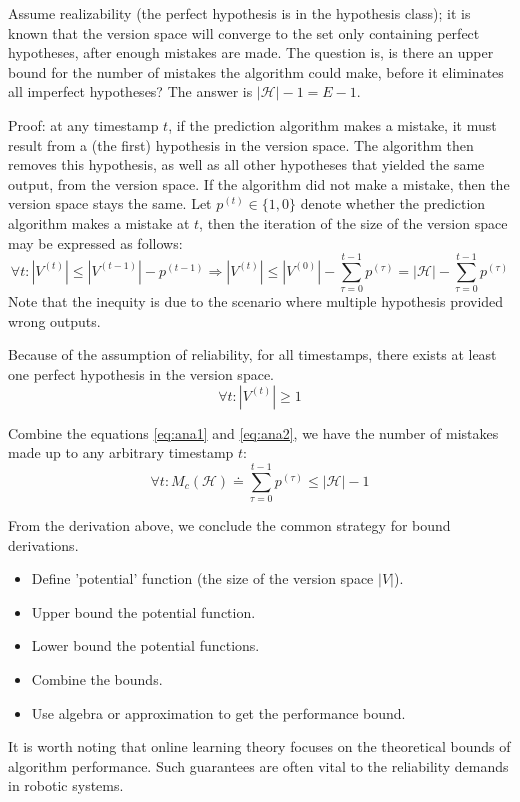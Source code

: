 \documentclass[11pt]{article}
\begin{document}
Assume realizability (the perfect hypothesis is in the hypothesis class); it is known that the version space will converge to the set only containing perfect hypotheses, after enough mistakes are made. The question is, is there an upper bound for the number of mistakes the algorithm could make, before it eliminates all imperfect hypotheses? The answer is $|\mathcal{H}|-1=E-1$.

Proof: at any timestamp $t$, if the prediction algorithm makes a mistake, it must result from a (the first) hypothesis in the version space. The algorithm then removes this hypothesis, as well as all other hypotheses that yielded the same output, from the version space. If the algorithm did not make a mistake, then the version space stays the same. Let $p^{(t)}\in\{1,0\}$ denote whether the prediction algorithm makes a mistake at $t$, then the iteration of the size of the version space may be expressed as follows: 
\begin{equation}
    \forall t:|V^{(t)}|\leq|V^{(t-1)}|-p^{(t-1)}\Rightarrow |V^{(t)}|\leq |V^{(0)}|-\sum_{\tau=0}^{t-1}p^{(\tau)}=|\mathcal{H}|-\sum_{\tau=0}^{t-1}p^{(\tau)}
    \label{eq:ana1}
\end{equation}
Note that the inequity is due to the scenario where multiple hypothesis provided wrong outputs.

Because of the assumption of reliability, for all timestamps, there exists at least one perfect hypothesis in the version space.
\begin{equation}
    \forall t: |V^{(t)}|\geq 1
    \label{eq:ana2}
\end{equation}

Combine the equations \ref{eq:ana1} and \ref{eq:ana2}, we have the number of mistakes made up to any arbitrary timestamp $t$:
\begin{equation}
    \forall t: M_c(\mathcal{H})\doteq\sum_{\tau=0}^{t-1}p^{(\tau)}\leq |\mathcal{H}|-1
\end{equation}

From the derivation above, we conclude the common strategy for bound derivations.
\begin{itemize}
    \item Define 'potential' function (the size of the version space $|V|$).
    \item Upper bound the potential function.
    \item Lower bound the potential functions.
    \item Combine the bounds.
    \item Use algebra or approximation to get the performance bound.
\end{itemize}

It is worth noting that online learning theory focuses on the theoretical bounds of algorithm performance. Such guarantees are often vital to the reliability demands in robotic systems.



\end{document}
